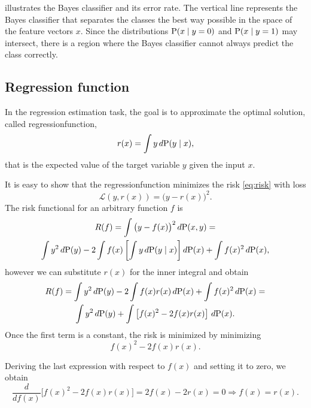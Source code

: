  illustrates the Bayes \gls{classifier} and its error rate.
The vertical line represents the Bayes \gls{classifier} that separates the classes the best way
possible in the space of the feature vectors $x$.  Since the distributions $\operatorname{P}(x \mid y
= 0)$ and $\operatorname{P}(x \mid y = 1)$ may intersect, there is a region where the Bayes
\gls{classifier} cannot always predict the class correctly.

\subsection{Regression function}
\label{sec:regression-function}

In the regression estimation task, the goal is to approximate the optimal solution, called
\gls{regressionfunction},
\begin{equation}
  \label{eq:regression-function}
  r(x) = \int y\, d\!\operatorname{P}(y \mid x)\text{,}
\end{equation}
that is the expected value of the target variable $y$ given the input $x$.

It is easy to show that the \gls{regressionfunction} minimizes the risk \eqref{eq:risk} with
\gls{loss}
\[
  \mathcal{L}(y, r(x)) = \big(y - r(x)\big)^2\text{.}
\]
The risk functional for an arbitrary function $f$ is
\begin{multline*}
  R(f) =
    \int \big(y - f(x)\big)^2\, d\!\operatorname{P}(x, y) =\\
    \int y^2\, d\!\operatorname{P}(y) -
    2 \int f(x) \left[ \int y\, d\!\operatorname{P}(y \mid x) \right] d\!\operatorname{P}(x) +
    \int f(x)^2\, d\!\operatorname{P}(x)\text{,}
\end{multline*}
however we can substitute $r(x)$ for the inner integral and obtain
\begin{multline*}
  R(f) =
    \int y^2\, d\!\operatorname{P}(y) - 2 \int f(x) r(x)\, d\!\operatorname{P}(x) + \int f(x)^2\, d\!\operatorname{P}(x) = \\
    \int y^2\, d\!\operatorname{P}(y) + \int \left[ f(x)^2 - 2 f(x) r(x) \right]\, d\!\operatorname{P}(x)\text{.}
\end{multline*}
Once the first term is a constant, the risk is minimized by minimizing
\[
  f(x)^2 - 2 f(x) r(x)\text{.}
\]

Deriving the last expression with respect to $f(x)$ and setting it to zero, we obtain
\begin{equation*}
  \frac{d}{d f(x)} \Big[ f(x)^2 - 2 f(x) r(x) \Big] = 2 f(x) - 2 r(x) = 0 \Rightarrow
  f(x) = r(x)\text{.}
\end{equation*}

